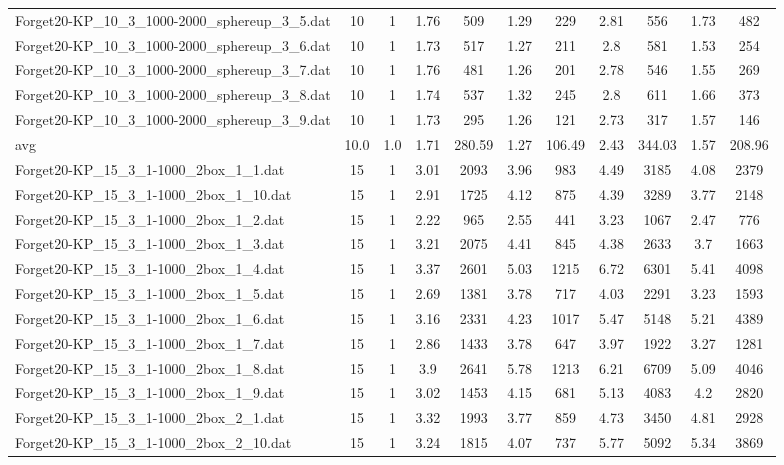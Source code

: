 \begin{table}[!ht]
\begin{tabular}{lcccccccccc}
Forget20-KP\_10\_3\_1000-2000\_sphereup\_3\_5.dat & 10 & 1 & 1.76 & 509 & 1.29 & 229 & 2.81 & 556 & 1.73 & 482 \\
Forget20-KP\_10\_3\_1000-2000\_sphereup\_3\_6.dat & 10 & 1 & 1.73 & 517 & 1.27 & 211 & 2.8 & 581 & 1.53 & 254 \\
Forget20-KP\_10\_3\_1000-2000\_sphereup\_3\_7.dat & 10 & 1 & 1.76 & 481 & 1.26 & 201 & 2.78 & 546 & 1.55 & 269 \\
Forget20-KP\_10\_3\_1000-2000\_sphereup\_3\_8.dat & 10 & 1 & 1.74 & 537 & 1.32 & 245 & 2.8 & 611 & 1.66 & 373 \\
Forget20-KP\_10\_3\_1000-2000\_sphereup\_3\_9.dat & 10 & 1 & 1.73 & 295 & 1.26 & 121 & 2.73 & 317 & 1.57 & 146 \\
\hline avg & 10.0 & 1.0 & 1.71& 280.59 & 1.27& 106.49 & 2.43& 344.03 & 1.57& 208.96\\ \hline
Forget20-KP\_15\_3\_1-1000\_2box\_1\_1.dat & 15 & 1 & 3.01 & 2093 & 3.96 & 983 & 4.49 & 3185 & 4.08 & 2379 \\
Forget20-KP\_15\_3\_1-1000\_2box\_1\_10.dat & 15 & 1 & 2.91 & 1725 & 4.12 & 875 & 4.39 & 3289 & 3.77 & 2148 \\
Forget20-KP\_15\_3\_1-1000\_2box\_1\_2.dat & 15 & 1 & 2.22 & 965 & 2.55 & 441 & 3.23 & 1067 & 2.47 & 776 \\
Forget20-KP\_15\_3\_1-1000\_2box\_1\_3.dat & 15 & 1 & 3.21 & 2075 & 4.41 & 845 & 4.38 & 2633 & 3.7 & 1663 \\
Forget20-KP\_15\_3\_1-1000\_2box\_1\_4.dat & 15 & 1 & 3.37 & 2601 & 5.03 & 1215 & 6.72 & 6301 & 5.41 & 4098 \\
Forget20-KP\_15\_3\_1-1000\_2box\_1\_5.dat & 15 & 1 & 2.69 & 1381 & 3.78 & 717 & 4.03 & 2291 & 3.23 & 1593 \\
Forget20-KP\_15\_3\_1-1000\_2box\_1\_6.dat & 15 & 1 & 3.16 & 2331 & 4.23 & 1017 & 5.47 & 5148 & 5.21 & 4389 \\
Forget20-KP\_15\_3\_1-1000\_2box\_1\_7.dat & 15 & 1 & 2.86 & 1433 & 3.78 & 647 & 3.97 & 1922 & 3.27 & 1281 \\
Forget20-KP\_15\_3\_1-1000\_2box\_1\_8.dat & 15 & 1 & 3.9 & 2641 & 5.78 & 1213 & 6.21 & 6709 & 5.09 & 4046 \\
Forget20-KP\_15\_3\_1-1000\_2box\_1\_9.dat & 15 & 1 & 3.02 & 1453 & 4.15 & 681 & 5.13 & 4083 & 4.2 & 2820 \\
Forget20-KP\_15\_3\_1-1000\_2box\_2\_1.dat & 15 & 1 & 3.32 & 1993 & 3.77 & 859 & 4.73 & 3450 & 4.81 & 2928 \\
Forget20-KP\_15\_3\_1-1000\_2box\_2\_10.dat & 15 & 1 & 3.24 & 1815 & 4.07 & 737 & 5.77 & 5092 & 5.34 & 3869 \\

\end{tabular}
\end{table}
